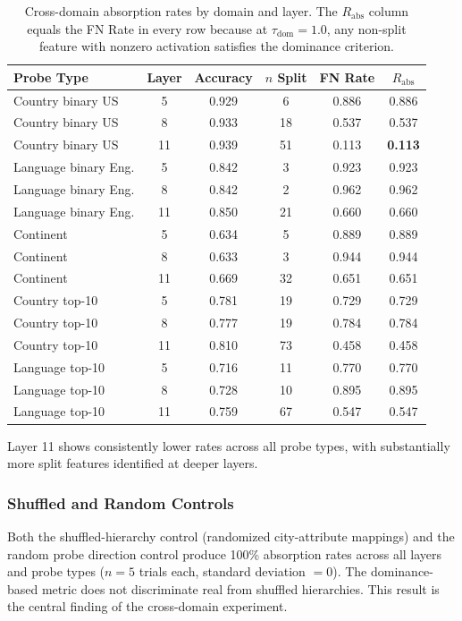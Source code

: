 \documentclass{article}
\begin{document}
\begin{table}[t]
\caption{Cross-domain absorption rates by domain and layer. The $R_{\text{abs}}$ column equals the FN Rate in every row because at $\tau_{\text{dom}} = 1.0$, any non-split feature with nonzero activation satisfies the dominance criterion.}
\label{tab:crossdomain}
\centering
\small
\begin{tabular}{@{}lccccc@{}}
\toprule
Probe Type & Layer & Accuracy & $n$ Split & FN Rate & $R_{\text{abs}}$ \\
\midrule
Country binary US & 5 & 0.929 & 6 & 0.886 & 0.886 \\
Country binary US & 8 & 0.933 & 18 & 0.537 & 0.537 \\
Country binary US & 11 & 0.939 & 51 & 0.113 & \textbf{0.113} \\
Language binary Eng. & 5 & 0.842 & 3 & 0.923 & 0.923 \\
Language binary Eng. & 8 & 0.842 & 2 & 0.962 & 0.962 \\
Language binary Eng. & 11 & 0.850 & 21 & 0.660 & 0.660 \\
Continent & 5 & 0.634 & 5 & 0.889 & 0.889 \\
Continent & 8 & 0.633 & 3 & 0.944 & 0.944 \\
Continent & 11 & 0.669 & 32 & 0.651 & 0.651 \\
Country top-10 & 5 & 0.781 & 19 & 0.729 & 0.729 \\
Country top-10 & 8 & 0.777 & 19 & 0.784 & 0.784 \\
Country top-10 & 11 & 0.810 & 73 & 0.458 & 0.458 \\
Language top-10 & 5 & 0.716 & 11 & 0.770 & 0.770 \\
Language top-10 & 8 & 0.728 & 10 & 0.895 & 0.895 \\
Language top-10 & 11 & 0.759 & 67 & 0.547 & 0.547 \\
\bottomrule
\end{tabular}
\end{table}

Layer 11 shows consistently lower rates across all probe types, with substantially more split features identified at deeper layers.

\subsubsection{Shuffled and Random Controls}

Both the shuffled-hierarchy control (randomized city-attribute mappings) and the random probe direction control produce 100\% absorption rates across all layers and probe types ($n = 5$ trials each, standard deviation $= 0$).
The dominance-based metric does not discriminate real from shuffled hierarchies.
This result is the central finding of the cross-domain experiment.
\end{document}
